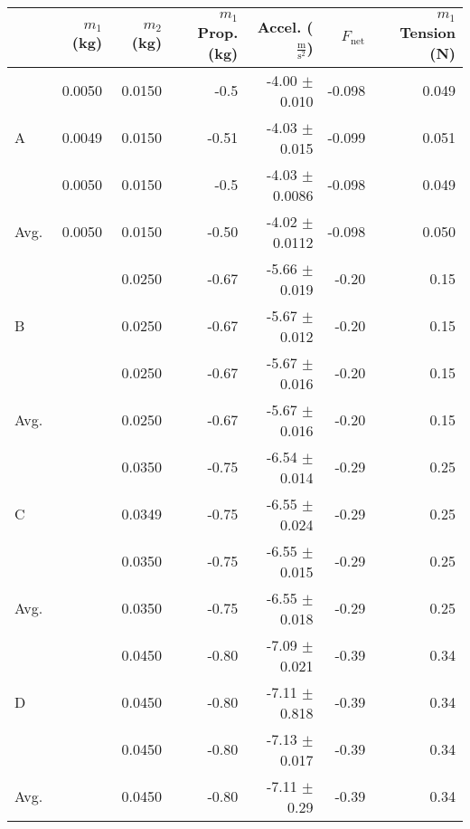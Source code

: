 \documentclass [12pt, letterpaper, twoside] {article}
\begin{document}
\begin {table}[h!]
  \centering
  \begin {tabular}{| l | r | r | r | r | r | r |}
    \hline\hline
    & \(m_{1}\) (kg) & \(m_{2}\) (kg) & \(m_{1}\) Prop. (kg) & Accel. (\(\tfrac{\text{m}}{\text{s}^2}\)) & \(F_{\text{net}}\) & \(m_{1}\) Tension (N) \\
    \hline
    \multirow{3}{*}{A} & 0.0050 & 0.0150 & -0.5 & -4.00 \(\pm\) 0.010 & -0.098 & 0.049 \\
    & 0.0049 & 0.0150 & -0.51 & -4.03 \(\pm\) 0.015 & -0.099 & 0.051 \\ %
    & 0.0050 & 0.0150 & -0.5 & -4.03 \(\pm\) 0.0086 & -0.098 & 0.049 \\
    \hline
    Avg. & 0.0050 & 0.0150 & -0.50 & -4.02 \(\pm\) 0.0112 & -0.098 & 0.050 \\%
    \hline
    \multirow{3}{*}{B} & & 0.0250 & -0.67 & -5.66 \(\pm\) 0.019 & -0.20 & 0.15 \\ %
    & & 0.0250 & -0.67 & -5.67 \(\pm\) 0.012 & -0.20 & 0.15 \\ %
    & & 0.0250 & -0.67 & -5.67 \(\pm\) 0.016 & -0.20 & 0.15 \\ %
    \hline
    Avg. & & 0.0250 & -0.67 & -5.67 \(\pm\) 0.016 & -0.20 & 0.15 \\ %
    \hline
    \multirow{3}{*}{C} & & 0.0350 & -0.75 & -6.54 \(\pm\) 0.014 & -0.29 & 0.25 \\ %
    & & 0.0349 & -0.75 & -6.55 \(\pm\) 0.024 & -0.29 & 0.25 \\ %
    & & 0.0350 & -0.75 & -6.55 \(\pm\) 0.015 & -0.29 & 0.25 \\ %
    \hline
    Avg. & & 0.0350 & -0.75 & -6.55 \(\pm\) 0.018 & -0.29 & 0.25 \\%
    \hline
    \multirow{3}{*}{D} & & 0.0450 & -0.80 & -7.09 \(\pm\) 0.021 & -0.39 & 0.34 \\ %
    & & 0.0450 & -0.80 & -7.11 \(\pm\) 0.818 & -0.39 & 0.34 \\ %
    & & 0.0450 & -0.80 & -7.13 \(\pm\) 0.017 & -0.39 & 0.34 \\ %
    \hline
    Avg. & & 0.0450 & -0.80 & -7.11 \(\pm\) 0.29 & -0.39 & 0.34 \\ %

\end{tabular}
\end{table}
\end{document}
